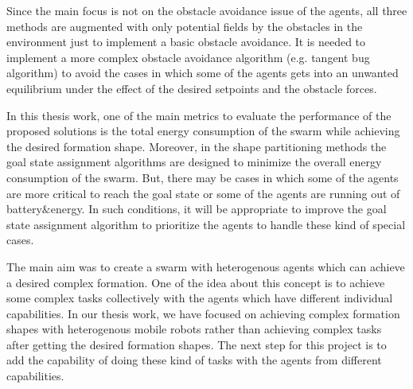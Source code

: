 \documentclass[twoside]{article}
\begin{document}
    Since the main focus is not on the obstacle avoidance issue of the agents, all three methods are augmented with only potential fields by the obstacles in the environment just to implement a basic obstacle avoidance. It is needed to implement a more complex obstacle avoidance algorithm (e.g. tangent bug algorithm) to avoid the cases in which some of the agents gets into an unwanted equilibrium under the effect of the desired setpoints and the obstacle forces.
    
    In this thesis work, one of the main metrics to evaluate the performance of the proposed solutions is the total energy consumption of the swarm while achieving the desired formation shape. Moreover, in the shape partitioning methods the goal state assignment algorithms are designed to minimize the overall energy consumption of the swarm. But, there may be cases in which some of the agents are more critical to reach the goal state or some of the agents are running out of battery$\&$energy. In such conditions, it will be appropriate to improve the goal state assignment algorithm to prioritize the agents to handle these kind of special cases. 
    
    The main aim was to create a swarm with heterogenous agents which can achieve a desired complex formation. One of the idea about this concept is to achieve some complex tasks collectively with the agents which have different individual capabilities. In our thesis work, we have focused on achieving complex formation shapes with heterogenous mobile robots rather than achieving complex tasks after getting the desired formation shapes. The next step for this project is to add the capability of doing these kind of tasks with the agents from different capabilities.
		
		
		
		
		
		
		
		
		
		
		
		
		
		
		
		
		

		
	
\end{document}
